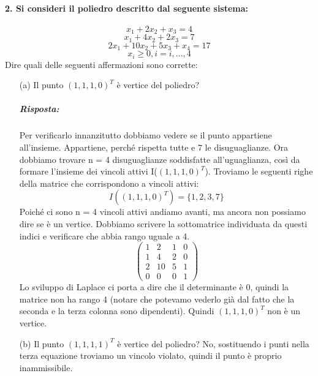 \paragraph{2. Si consideri il poliedro descritto dal seguente sistema:}
\begin{equation*}
    x_1 + 2x_2 + x_3 = 4
\end{equation*}
\begin{equation*}
    x_1 + 4x_2 + 2x_3 = 7
\end{equation*}
\begin{equation*}
    2x_1 + 10x_2 + 5x_3 + x_4 = 17
\end{equation*}
\begin{equation*}
    x_i \geq 0, i = i, ..., 4
\end{equation*}
Dire quali delle seguenti affermazioni sono corrette:
\begin{itemize}
    \item[(a)] Il punto $(1, 1, 1, 0)^T$ è vertice del poliedro?
    
    \subparagraph{Risposta:} Per verificarlo innanzitutto dobbiamo vedere se il punto appartiene all'insieme. Appartiene, perché rispetta tutte e 7 le disuguaglianze. Ora dobbiamo trovare n = 4 disuguaglianze soddisfatte all'uguaglianza, così da formare l'insieme dei vincoli attivi I($(1, 1, 1, 0)^T$). Troviamo le seguenti righe della matrice che corrispondono a vincoli attivi:
    \begin{equation*}
        I((1, 1, 1, 0)^T) = \{1,2,3,7\}
    \end{equation*}
    Poiché ci sono n = 4 vincoli attivi andiamo avanti, ma ancora non possiamo dire se è un vertice. Dobbiamo scrivere la sottomatrice individuata da questi indici e verificare che abbia rango uguale a 4.
    \begin{equation*}
        \begin{pmatrix}
            1 & 2 & 1 & 0\\
            1 & 4 & 2 & 0\\
            2 & 10 & 5 & 1\\
            0 & 0 & 0 & 1
        \end{pmatrix}
    \end{equation*}
    Lo sviluppo di Laplace ci porta a dire che il determinante è 0, quindi la matrice non ha rango 4 (notare che potevamo vederlo già dal fatto che la seconda e la terza colonna sono dipendenti). Quindi $(1,1,1,0)^T$ non è un vertice.
    
    
    \item[(b)] Il punto $(1, 1, 1, 1)^T$ è vertice del poliedro? No, sostituendo i punti nella terza equazione troviamo un vincolo violato, quindi il punto è proprio inammissibile.
    

\end{itemize}

